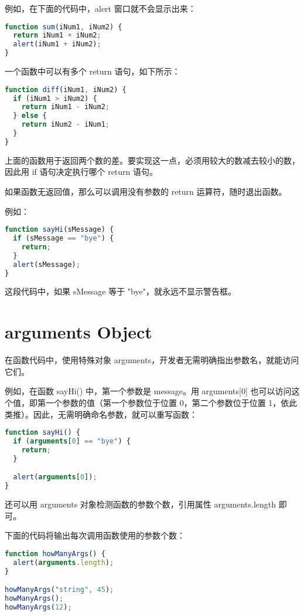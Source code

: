 例如，在下面的代码中，alert 窗口就不会显示出来：


\begin{lstlisting}[language=JavaScript]
function sum(iNum1, iNum2) {
  return iNum1 + iNum2;
  alert(iNum1 + iNum2);
}
\end{lstlisting}

一个函数中可以有多个 return 语句，如下所示：




\begin{lstlisting}[language=JavaScript]
function diff(iNum1, iNum2) {
  if (iNum1 > iNum2) {
    return iNum1 - iNum2;
  } else {
    return iNum2 - iNum1;
  }
}
\end{lstlisting}


上面的函数用于返回两个数的差。要实现这一点，必须用较大的数减去较小的数，因此用 if 语句决定执行哪个 return 语句。

如果函数无返回值，那么可以调用没有参数的 return 运算符，随时退出函数。

例如：

\begin{lstlisting}[language=JavaScript]
function sayHi(sMessage) {
  if (sMessage == "bye") {
    return;
  }
  alert(sMessage);
}
\end{lstlisting}


这段代码中，如果 sMessage 等于 "bye"，就永远不显示警告框。


\chapter{arguments Object}


在函数代码中，使用特殊对象 arguments，开发者无需明确指出参数名，就能访问它们。

例如，在函数 sayHi() 中，第一个参数是 message。用 arguments[0] 也可以访问这个值，即第一个参数的值（第一个参数位于位置 0，第二个参数位于位置 1，依此类推）。因此，无需明确命名参数，就可以重写函数：


\begin{lstlisting}[language=JavaScript]
function sayHi() {
  if (arguments[0] == "bye") {
    return;
  }

  alert(arguments[0]);
}
\end{lstlisting}

还可以用 arguments 对象检测函数的参数个数，引用属性 arguments.length 即可。

下面的代码将输出每次调用函数使用的参数个数：

\begin{lstlisting}[language=JavaScript]
function howManyArgs() {
  alert(arguments.length);
}

howManyArgs("string", 45);
howManyArgs();
howManyArgs(12);
\end{lstlisting}


